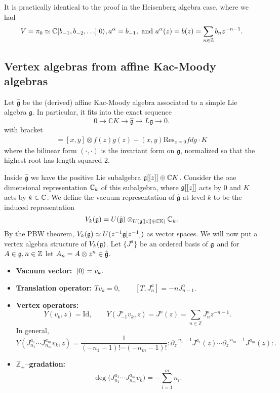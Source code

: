 \documentclass[12pt]{article}
\begin{document}
It is practically identical to the proof in the Heisenberg algebra case,
where we had \begin{align*}
    V=\pi_0\simeq\mathbb{C}[b_{-1},b_{-2},\ldots]\lvert 0 \rangle,
    a^\alpha=b_{-1}, \text{ and } a^\alpha(z)=b(z)=\sum_{n\in\mathbb{Z}} b_n z^{-n-1}.
\end{align*}

\subsection{Vertex algebras from affine Kac-Moody algebras}
Let $\hat{\mathfrak{g}}$ be the (derived) affine Kac-Moody algebra associated to a simple Lie algebra $\mathfrak{g}$. In particular, it fits into the exact sequence
\[0 \to \mathbb{C}K \to \hat{\mathfrak{g}} \to L\mathfrak{g} \to 0.\]
with bracket 
\begin{align*}
    [x\otimes f(z), y\otimes g(z)] = [x,y]\otimes f(z)g(z) - (x,y)\mathrm{Res}_{z=0} f dg \cdot K
\end{align*} where the bilinear form $(\cdot,\cdot)$ is the invariant form on $\mathfrak{g}$, normalized so that the highest root has length squared 2.

Inside $\hat{\mathfrak{g}}$ we have the positive Lie subalgebra $\mathfrak{g}[[z]] \oplus \mathbb{C}K$. Consider the one dimensional representation $\mathbb{C}_k$ of this subalgebra, where $\mathfrak{g}[[z]]$ acts by 0 and $K$ acts by $k\in\mathbb{C}$. We define the vacuum representation of $\hat{\mathfrak{g}}$ at level $k$ to be the induced representation
\[V_k(\mathfrak{g}) = U(\hat{\mathfrak{g}}) \otimes_{U(\mathfrak{g}[[z]] \oplus \mathbb{CK})} \mathbb{C}_k.\]
By the PBW theorem, $V_k(\mathfrak{g}) \simeq U(z^{-1}\mathfrak g[z^{-1}])$ as vector spaces. We will now put a vertex algebra structure of $V_k(\mathfrak{g})$. Let $\{J^a\}$ be an ordered basis of $\mathfrak{g}$ and for $A\in \mathfrak{g}, n\in \mathbb{Z}$ let $A_n = A\otimes z^n \in \hat{\mathfrak{g}}$. 
\begin{itemize}
\item \textbf{Vacuum vector:} $\;\lvert 0 \rangle=v_k.$
\item \textbf{Translation operator:} $T v_k = 0,\qquad [T, J^a_n] = -n J^a_{n-1}.$
\end{itemize}

\begin{itemize}
\item \textbf{Vertex operators:}
\[
Y(v_k,z) = \mathrm{Id},\qquad
Y(J^a_{-1} v_k, z) = J^a(z) = \sum_{n\in\mathbb{Z}} J^a_n z^{-n-1}.
\]
In general,
\begin{equation}\label{2.4.5}
Y(J^{a_1}_{n_1}\cdots J^{a_m}_{n_m} v_k, z)
= \frac{1}{(-n_1-1)!\cdots(-n_m-1)!}
:\partial_z^{-n_1-1} J^{a_1}(z)\cdots \partial_z^{-n_m-1} J^{a_m}(z):.
\end{equation}

\item \textbf{$\mathbb{Z}_+$–gradation:}
\[
\deg\!\big(J^{a_1}_{n_1}\cdots J^{a_m}_{n_m} v_k\big)
= -\sum_{i=1}^m n_i.
\]
\end{itemize}
\end{document}
